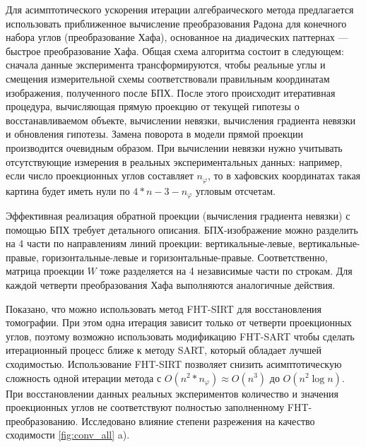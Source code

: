 Для асимптотического ускорения итерации алгебраического метода предлагается использовать приближенное вычисление преобразования Радона для конечного набора углов (преобразование Хафа), основанное на диадических паттернах --- быстрое преобразование Хафа.
Общая схема алгоритма состоит в следующем: сначала данные эксперимента трансформируются, чтобы реальные углы и смещения измерительной схемы соответствовали правильным координатам изображения, полученного после БПХ.
После этого происходит итеративная процедура, вычисляющая прямую проекцию от текущей гипотезы о восстанавливаемом объекте, вычислении невязки, вычисления градиента невязки и обновления гипотезы.
Замена поворота в модели прямой проекции производится очевидным образом.
При вычислении невязки нужно учитывать отсутствующие измерения в реальных экспериментальных данных: например, если число проекционных углов составляет $n_\varphi$, то в хафовских координатах такая картина будет иметь нули по $4 * n - 3 - n_\varphi$ угловым отсчетам.

Эффективная реализация обратной проекции (вычисления градиента невязки) с помощью БПХ требует детального описания.
БПХ-изображение можно разделить на 4 части по направлениям линий проекции: вертикальные-левые, вертикальные-правые, горизонтальные-левые и горизонтальные-правые.
Соответственно, матрица проекции $W$ тоже разделяется на 4 независимые части по строкам.
Для каждой четверти преобразования Хафа выполняются аналогичные действия.

Показано, что можно использовать метод FHT-SIRT для восстановления томографии.
При этом одна итерация зависит только от четверти проекционных углов, поэтому возможно использовать модификацию FHT-SART чтобы сделать итерационный процесс ближе к методу SART, который обладает лучшей сходимостью.
Использование FHT-SIRT позволяет снизить асимптотическую сложность одной итерации метода с $O(n^2 * n_\varphi) \approx O(n^3)$ до $O(n^2 \log n)$.
При восстановлении данных реальных экспериментов количество и значения проекционных углов не соответствуют полностью заполненному FHT-преобразованию. 
Исследовано влияние степени разрежения на качество сходимости \ref{fig:conv_all} a).

